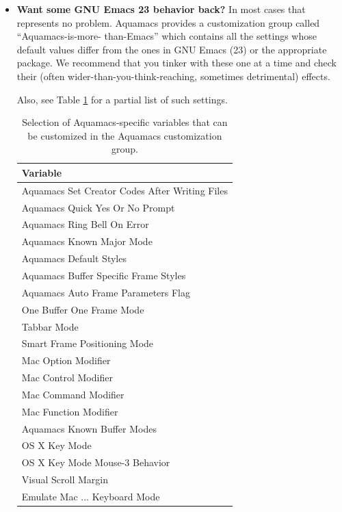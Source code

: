 \documentclass[11pt,letterpaper]{article}
\begin{document}
\begin{itemize}
\item \textbf{Want some GNU Emacs 23 behavior back?} In most cases
  that represents no problem. Aquamacs provides a customization group called ``Aquamacs-is-more- than-Emacs'' which contains all the settings whose default values differ from the ones in GNU Emacs (23) or the appropriate package. We recommend that you tinker with these one at a time and check their (often wider-than-you-think-reaching, sometimes detrimental) effects.

Also, see Table \ref{tab:variables} for a partial list of such settings.

\begin{table}[t]
\begin{center}
 \begin{tabular}{|l|}

\hline  \textbf{Variable}\\

\hline Aquamacs Set Creator Codes After Writing Files\\
\hline Aquamacs Quick Yes Or No Prompt\\
\hline Aquamacs Ring Bell On Error\\
\hline Aquamacs Known Major Mode\\
\hline Aquamacs Default Styles\\
\hline Aquamacs Buffer Specific Frame Styles\\ 
\hline Aquamacs Auto Frame Parameters Flag\\
\hline One Buffer One Frame Mode\\
\hline Tabbar Mode\\
\hline Smart Frame Positioning Mode\\
\hline Mac Option Modifier\\ 
\hline Mac Control Modifier\\ 
\hline Mac Command Modifier\\ 
\hline Mac Function Modifier\\ 
\hline Aquamacs Known Buffer Modes \\
\hline OS X Key Mode \\
\hline OS X Key Mode Mouse-3 Behavior \\
\hline Visual Scroll Margin \\
\hline Emulate Mac ... Keyboard Mode \\
\hline
\end{tabular} 
\caption{Selection of Aquamacs-specific variables that can be customized in the Aquamacs 
customization group.}
\label{tab:variables}
\end{center}
\end{table}


\end{itemize}
\end{document}

